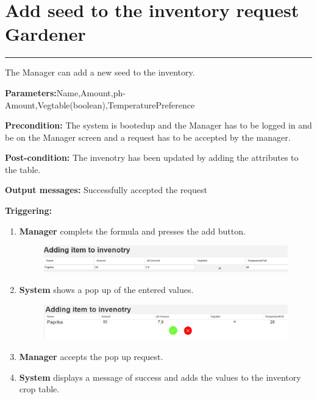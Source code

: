 \section{Add seed to the inventory request Gardener}

\hrule
\hfill
\vspace{0.5cm}

\label{operation:Add a diffrent seed request Gardener}

The Manager can add a new seed to the inventory.
\begin{description}
\item
\textbf{Parameters:}Name,Amount,ph-Amount,Vegtable(boolean),TemperaturePreference
\item \textbf{Precondition:} The system is bootedup and the Manager has to be
logged in and be on the Manager screen and a request has to be accepted by the
manager.
\item \textbf{Post-condition:} The invenotry has been updated by adding the
attributes to the table.
\item 
\item \item \textbf{Output messages:} Successfully accepted the request
\item \textbf{Triggering:}
\begin{enumerate}
\item \textbf{Manager} complets the formula and presses the add button.
\begin{figure}[H]
\includegraphics[width=1\textwidth]{images/AddingSeedToTheInventoryManager.eps}
\end{figure}
\item \textbf{System} shows a pop up of the entered values.
\begin{figure}[H]
\includegraphics[width=1\textwidth]{images/AddingSeedToTheInventoryPopUp.eps}
\end{figure}
\item \textbf{Manager} accepts the pop up request.
\item \textbf{System} displays a message of success and adds the values to the
inventory crop table.

\end{enumerate}
\end{description}

